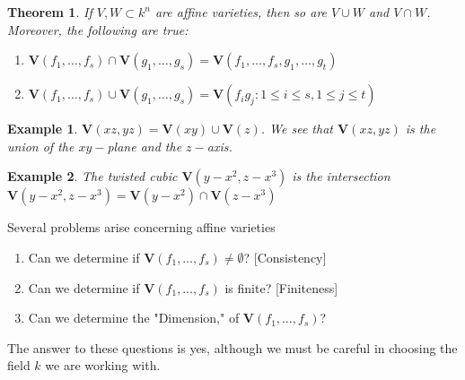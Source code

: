 \documentclass{article}
\theoremstyle{mystyle}
\newtheorem{theorem}{Theorem}[section]
\newtheorem{example}{Example}[section]
\begin{document}
\begin{theorem}
If $V,W\subset k^n$ are affine varieties, then so are $V\cup W$ and $V\cap W$. Moreover, the following are true:
\begin{enumerate}
    \item $\mathbf{V}(f_1,\hdots, f_s) \cap \mathbf{V}(g_1,\hdots, g_s) = \mathbf{V}(f_1,\hdots, f_s,g_1,\hdots, g_t)$
    \item $\mathbf{V}(f_1,\hdots, f_s) \cup \mathbf{V}(g_1,\hdots, g_s) = \mathbf{V}(f_i g_j: 1\leq i \leq s, 1\leq j\leq t)$
\end{enumerate}
\end{theorem}
\begin{example}
$\mathbf{V}(xz,yz) = \mathbf{V}(xy)\cup \mathbf{V}(z)$. We see that $\mathbf{V}(xz,yz)$ is the union of the $xy-$plane and the $z-$axis.
\end{example}
\begin{example}
The twisted cubic $\mathbf{V}(y-x^2,z-x^3)$ is the intersection $\mathbf{V}(y-x^2,z-x^3) = \mathbf{V}(y-x^2)\cap \mathbf{V}(z-x^3)$
\end{example}
Several problems arise concerning affine varieties
\begin{enumerate}
    \item Can we determine if $\mathbf{V}(f_1,\hdots, f_s) \ne \emptyset$? \hfill [Consistency]
    \item Can we determine if $\mathbf{V}(f_1,\hdots, f_s)$ is finite? \hfill [Finiteness]
    \item Can we determine the "Dimension," of $\mathbf{V}(f_1,\hdots, f_s)$?
\end{enumerate}
The answer to these questions is yes, although we must be careful in choosing the field $k$ we are working with. 
\end{document}
